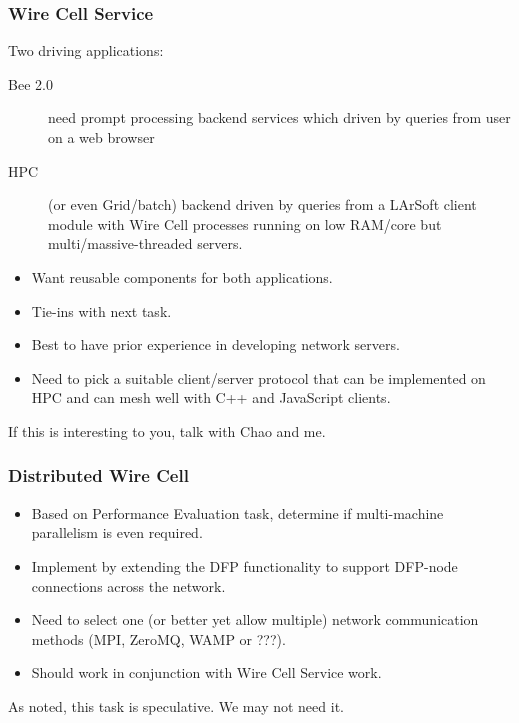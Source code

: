 \documentclass[xcolor=dvipsnames]{beamer}
\begin{document}
\begin{frame}
  \frametitle{Wire Cell Service}

  Two driving applications:
  \begin{description}
  \item[Bee 2.0] need prompt processing backend services which driven
    by queries from user on a web browser
  \item[HPC] (or even Grid/batch) backend driven by queries from a
    LArSoft client module with Wire Cell processes running on low
    RAM/core but multi/massive-threaded servers.
  \end{description}

  \begin{itemize}
  \item Want reusable components for both applications.
  \item Tie-ins with next task.
  \item Best to have prior experience in developing network servers.
  \item Need to pick a suitable client/server protocol that can be
    implemented on HPC and can mesh well with C++ and JavaScript
    clients.
  \end{itemize}

  If this is interesting to you, talk with Chao and me.

\end{frame}

\begin{frame}
  \frametitle{Distributed Wire Cell}

  \begin{itemize}
  \item Based on Performance Evaluation task, determine if
    multi-machine parallelism is even required.
  \item Implement by extending the DFP functionality to support
    DFP-node connections across the network.
  \item Need to select one (or better yet allow multiple) network
    communication methods (MPI, ZeroMQ, WAMP or ???).
  \item Should work in conjunction with Wire Cell Service work.
  \end{itemize}

  As noted, this task is speculative.  We may not need it.

\end{frame}
\end{document}
